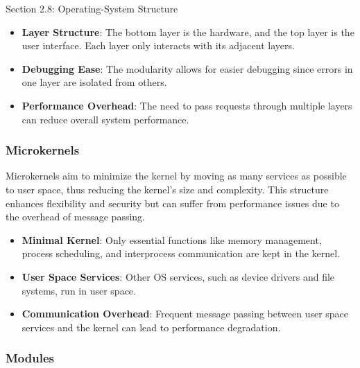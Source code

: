 \begin{notes}{Section 2.8: Operating-System Structure}
    \begin{highlight}
    
    \begin{itemize}
        \item \textbf{Layer Structure}: The bottom layer is the hardware, and the top layer is the user interface. Each layer only interacts with its adjacent layers.
        \item \textbf{Debugging Ease}: The modularity allows for easier debugging since errors in one layer are isolated from others.
        \item \textbf{Performance Overhead}: The need to pass requests through multiple layers can reduce overall system performance.
    \end{itemize}
    
    \end{highlight}
    
    \subsubsection*{Microkernels}
    
    Microkernels aim to minimize the kernel by moving as many services as possible to user space, thus reducing the kernel's size and complexity. This structure enhances flexibility and security but 
    can suffer from performance issues due to the overhead of message passing.
    
    \begin{highlight}[Microkernels]
    
    \begin{itemize}
        \item \textbf{Minimal Kernel}: Only essential functions like memory management, process scheduling, and interprocess communication are kept in the kernel.
        \item \textbf{User Space Services}: Other OS services, such as device drivers and file systems, run in user space.
        \item \textbf{Communication Overhead}: Frequent message passing between user space services and the kernel can lead to performance degradation.
    \end{itemize}
    
    \end{highlight}
    
    \subsubsection*{Modules}
    

\end{notes}
